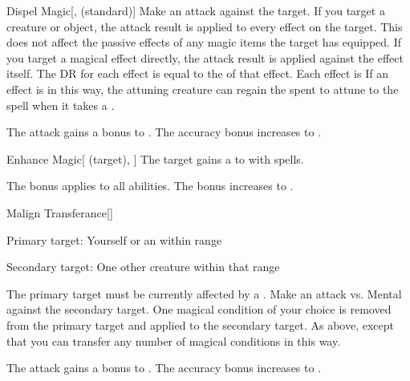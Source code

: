 \lowercase{\hypertarget{spell:Dispel Magic}{}}\label{spell:Dispel Magic}
\begin{freeability}[Rank 3]{\hypertarget{spell:Dispel Magic}{Dispel Magic}}[,  (standard)]
Make an attack against the target.
If you target a creature or object, the attack result is applied to every  effect on the target.
This does not affect the passive effects of any magic items the target has equipped.
If you target a magical effect directly, the attack result is applied against the effect itself.
The DR for each effect is equal to the  of that effect.
\hit Each effect is 
If an  effect is  in this way,
the attuning creature can regain the  spent to attune to the spell when it takes a .

\rankline
{} The attack gains a  bonus to .
 The accuracy bonus increases to .
\end{freeability}
\vspace{0.25em}



\lowercase{\hypertarget{spell:Enhance Magic}{}}\label{spell:Enhance Magic}
\begin{attuneability}[Rank 3]{\hypertarget{spell:Enhance Magic}{Enhance Magic}}[ (target), ]
The target gains a   to  with spells.

\rankline
{} The bonus applies to all  abilities.
 The bonus increases to .
\end{attuneability}
\vspace{0.25em}



\lowercase{\hypertarget{spell:Malign Transferance}{}}\label{spell:Malign Transferance}
\begin{freeability}[Rank 3]{\hypertarget{spell:Malign Transferance}{Malign Transferance}}[]

Primary target: Yourself or an  within \rngmed range
\par\noindent
Secondary target: One other creature within that range

The primary target must be currently affected by a  .
Make an attack vs. Mental against the secondary target.
\hit One magical condition of your choice is removed from the primary target and applied to the secondary target.
\crit As above, except that you can transfer any number of magical conditions in this way.

\rankline
{} The attack gains a  bonus to .
 The accuracy bonus increases to .
\end{freeability}
\vspace{0.25em}



